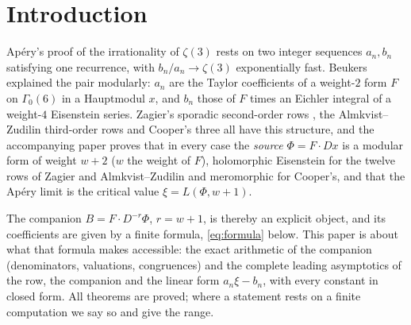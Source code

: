 \documentclass[11pt]{amsart}
\theoremstyle{definition}
\theoremstyle{remark}
\begin{document}
\section{Introduction}\label{sec:intro}

Ap\'ery's proof of the irrationality of $\zeta(3)$ rests on two integer sequences $a_n,b_n$ satisfying one recurrence, with $b_n/a_n\to\zeta(3)$ exponentially fast. Beukers \cite{Beukers1987} explained the pair modularly: $a_n$ are the Taylor coefficients of a weight-$2$ form $F$ on $\Gamma_0(6)$ in a Hauptmodul $x$, and $b_n$ those of $F$ times an Eichler integral of a weight-$4$ Eisenstein series. Zagier's sporadic second-order rows \cite{Zagier}, the Almkvist--Zudilin third-order rows \cite{AZ} and Cooper's three \cite{Cooper} all have this structure, and the accompanying paper \cite{ProjSources} proves that in every case the \emph{source} $\Phi=F\cdot Dx$ is a modular form of weight $w+2$ ($w$ the weight of $F$), holomorphic Eisenstein for the twelve rows of Zagier and Almkvist--Zudilin and meromorphic for Cooper's, and that the Ap\'ery limit is the critical value $\xi=L(\Phi,w+1)$.

The companion $B=F\cdot D^{-r}\Phi$, $r=w+1$, is thereby an explicit object, and its coefficients are given by a finite formula, \eqref{eq:formula} below. This paper is about what that formula makes accessible: the exact arithmetic of the companion (denominators, valuations, congruences) and the complete leading asymptotics of the row, the companion and the linear form $a_n\xi-b_n$, with every constant in closed form. All theorems are proved; where a statement rests on a finite computation we say so and give the range.
\end{document}

